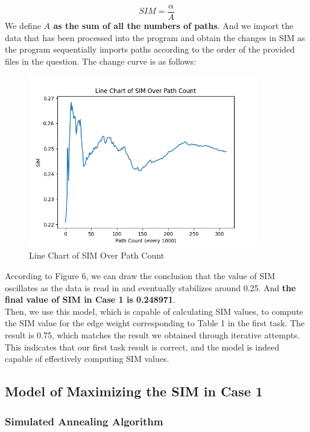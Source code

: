 \begin{equation}
    SIM=\frac{\alpha}{A}
\end{equation}
\indent We define \textbf{$A$ as the sum of all the numbers of paths}. And we import the data that has been processed into the program and obtain the changes in SIM as the program sequentially imports paths according to the order of the provided files in the question. The change curve is as follows:\\
\begin{figure}[H]%
    \centering
    \includegraphics[width=10cm,height=7.5cm]{Figure_1-1.png}
    \caption{Line Chart of SIM Over Path Count}
\end{figure}
\indent According to Figure 6, we can draw the conclusion that the value of SIM oscillates as the data is read in and eventually stabilizes around 0.25.  And \textbf{the final value of SIM in Case 1 is 0.248971}.\\
\indent Then, we use this model, which is capable of calculating SIM values, to compute the SIM value for the edge weight corresponding to Table 1 in the first task. The result is 0.75, which matches the result we obtained through iterative attempts. This indicates that our first task result is correct, and the model is indeed capable of effectively computing SIM values.

\subsection{Model of Maximizing the SIM in Case 1}

\subsubsection{Simulated Annealing Algorithm}

